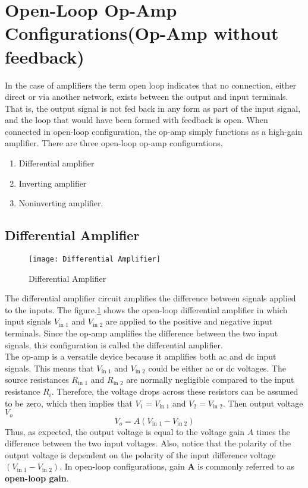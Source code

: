    \section{ Open-Loop Op-Amp Configurations(Op-Amp without feedback)}
   In the case of amplifiers the term open loop indicates that no connection, either direct or via another network, exists between the output and input terminals. That is, the output signal is not fed back in any form as part of the input signal, and the loop that would have been formed with feedback is open. When connected in open-loop configuration, the op-amp simply functions as a high-gain amplifier. There are three open-loop op-amp configurations,
   \begin{enumerate}
   	\item Differential amplifier
   	\item Inverting amplifier
   	\item Noninverting amplifier.
   \end{enumerate}
   
   \subsection{Differential Amplifier}
   \begin{figure}[H]
   	\centering
   	\texttt{[image: Differential Amplifier]}
   	\caption{Differential Amplifier}
   	\label{Differential Amplifier}
   \end{figure}
   The differential amplifier circuit amplifies the difference between signals applied to the inputs. The figure.\ref{Differential Amplifier} shows the open-loop differential amplifier in which input signals $V_{\text {in } 1}$ and $V_{\text {in } 2}$ are applied to the positive and negative input terminals. Since the op-amp amplifies the difference between the two input signals, this configuration is called the differential amplifier.\\
   The op-amp is a versatile device because it amplifies both ac and dc input signals. This means that $V_{\text {in } 1}$ and $V_{\text {in } 2}$ could be either ac or dc voltages. The source resistances $R_{\text {in } 1}$ and $R_{\text {in } 2}$ are normally negligible compared to the input resistance $R_{i}$. Therefore, the voltage drops across these resistors can be assumed to be zero, which then implies that $V_{1}=V_{\text {in } 1}$ and $V_{2}=V_{\text {in } 2}$. Then output voltage$V_o$ 
   \begin{equation}
   V_{o}=A\left(V_{\text {in } 1}-V_{\text {in } 2}\right)
   \end{equation}
   Thus, as expected, the output voltage is equal to the voltage gain $A$ times the difference between the two input voltages. Also, notice that the polarity of the output voltage is dependent on the polarity of the input difference voltage $\left(V_{\text {in } 1}-V_{\text {in } 2}\right) .$ In open-loop configurations, gain $\mathbf{A}$ is commonly referred to as \textbf{open-loop gain}. 
